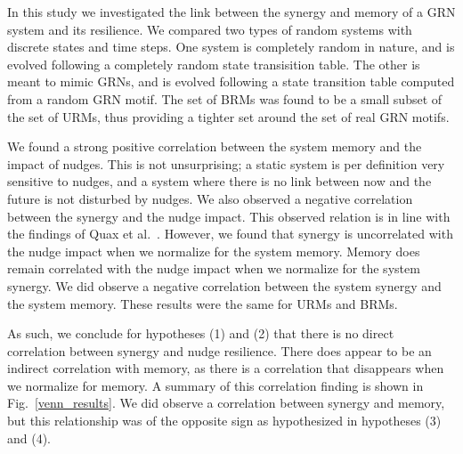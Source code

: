 \documentclass[../main.tex]{subfiles}
\begin{document}

In this study we investigated the link between the synergy and memory of a GRN system and its resilience.
We compared two types of random systems with discrete states and time steps.
One system is completely random in nature, and is evolved following a completely random state transisition table.
The other is meant to mimic GRNs, and is evolved following a state transition table computed from a random GRN motif.
The set of BRMs was found to be a small subset of the set of URMs, thus providing a tighter set around the set of real GRN motifs.

We found a strong positive correlation between the system memory and the impact of nudges.
This is not unsurprising; a static system is per definition very sensitive to nudges, and a system where there is no link between now and the future is not disturbed by nudges.
We also observed a negative correlation between the synergy and the nudge impact.
This observed relation is in line with the findings of Quax et al.~\cite{quax2017quantifying}.
However, we found that synergy is uncorrelated with the nudge impact when we normalize for the system memory.
Memory does remain correlated with the nudge impact when we normalize for the system synergy.
We did observe a negative correlation between the system synergy and the system memory.
These results were the same for URMs and BRMs.

As such, we conclude for hypotheses (1) and (2) that there is no direct correlation between synergy and nudge resilience.
There does appear to be an indirect correlation with memory, as there is a correlation that disappears when we normalize for memory.
A summary of this correlation finding is shown in Fig.~\ref{venn_results}.
We did observe a correlation between synergy and memory, but this relationship was of the opposite sign as hypothesized in hypotheses (3) and (4).
\end{document}
